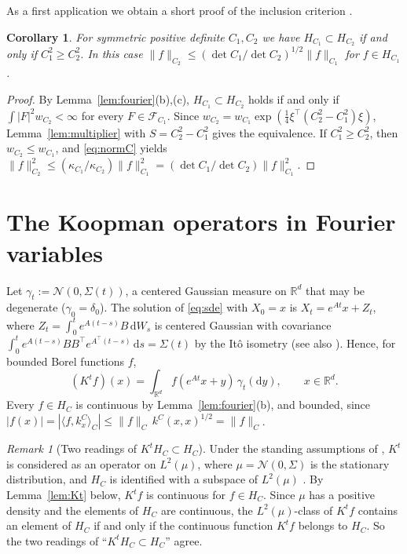 \documentclass[11pt]{amsart}
\numberwithin{equation}{section}
\newtheorem{corollary}[theorem]{Corollary}
\theoremstyle{definition}
\theoremstyle{remark}
\newtheorem{remark}[theorem]{Remark}
\newcommand{\R}{\mathbb{R}}
\newcommand{\dd}{\,\mathrm{d}}
\newcommand{\FC}[1]{\mathcal{F}_{#1}}
\newcommand{\ip}[2]{\langle #1,#2\rangle}
\newcommand{\tp}{\top}
\begin{document}
As a first application we obtain a short proof of the inclusion criterion \cite[Proposition~3.3]{PSWPN}.

\begin{corollary}\label{cor:inclusion}
For symmetric positive definite $C_1,C_2$ we have $H_{C_1}\subset H_{C_2}$ if and only if $C_1^2\ge C_2^2$. In this case
$\|f\|_{C_2}\le(\det C_1/\det C_2)^{1/2}\|f\|_{C_1}$ for $f\in H_{C_1}$.
\end{corollary}

\begin{proof}
By Lemma~\ref{lem:fourier}(b),(c), $H_{C_1}\subset H_{C_2}$ holds if and only if $\int|F|^2w_{C_2}<\infty$ for every
$F\in\FC{C_1}$. Since $w_{C_2}=w_{C_1}\exp(\frac14\xi^\tp(C_2^2-C_1^2)\xi)$, Lemma~\ref{lem:multiplier} with
$S=C_2^2-C_1^2$ gives the equivalence. If $C_1^2\ge C_2^2$, then $w_{C_2}\le w_{C_1}$, and \eqref{eq:normC} yields
$\|f\|_{C_2}^2\le(\kappa_{C_1}/\kappa_{C_2})\|f\|_{C_1}^2=(\det C_1/\det C_2)\|f\|_{C_1}^2$.
\end{proof}

\section{The Koopman operators in Fourier variables}\label{sec:koopman}

Let $\gamma_t:=\mathcal N(0,\Sigma(t))$, a centered Gaussian measure on $\R^d$ that may be degenerate
($\gamma_0=\delta_0$). The solution of \eqref{eq:sde} with $X_0=x$ is $X_t=e^{At}x+Z_t$, where
$Z_t=\int_0^te^{A(t-s)}B\dd W_s$ is centered Gaussian with covariance
$\int_0^te^{A(t-s)}BB^\tp e^{A^\tp(t-s)}\dd s=\Sigma(t)$ by the It\^o isometry (see also \cite{Vatiwutipong}).
Hence, for bounded Borel functions $f$,
\begin{equation}\label{eq:Ktconv}
(K^tf)(x)=\int_{\R^d}f(e^{At}x+y)\,\gamma_t(\mathrm dy),\qquad x\in\R^d .
\end{equation}
Every $f\in H_C$ is continuous by Lemma~\ref{lem:fourier}(b), and bounded, since
$|f(x)|=|\ip f{k^C_x}_C|\le\|f\|_C\,k^C(x,x)^{1/2}=\|f\|_C$.

\begin{remark}[Two readings of $K^tH_C\subset H_C$]\label{rem:L2mu}
Under the standing assumptions of \cite{PSWPN}, $K^t$ is considered as an operator on $L^2(\mu)$, where
$\mu=\mathcal N(0,\Sigma)$ is the stationary distribution, and $H_C$ is identified with a subspace of $L^2(\mu)$
\cite[Lemma~3.1]{PSWPN}. By Lemma~\ref{lem:Kt} below, $K^tf$ is continuous for $f\in H_C$. Since $\mu$ has a positive
density and the elements of $H_C$ are continuous, the $L^2(\mu)$-class of $K^tf$ contains an element of $H_C$ if and
only if the continuous function $K^tf$ belongs to $H_C$. So the two readings of ``$K^tH_C\subset H_C$'' agree.
\end{remark}
\end{document}
